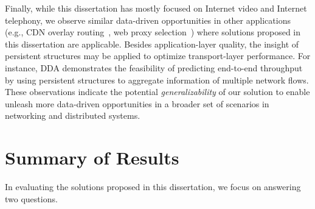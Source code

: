 %
Finally, while this dissertation has mostly focused on 
Internet video and Internet telephony, 
we observe similar data-driven opportunities in other applications
(e.g., CDN overlay routing~\cite{mukerjee2015practical}, 
web proxy selection~\cite{footprint})
where solutions proposed in this dissertation are applicable.
Besides application-layer quality, the insight of persistent structures may be applied 
to optimize transport-layer performance.
For instance, DDA demonstrates the feasibility of predicting end-to-end 
throughput by using persistent structures to aggregate information of multiple network flows.
These observations indicate the potential {\em generalizability} of our solution to enable
unleash more data-driven opportunities in a broader set of scenarios in 
networking and distributed systems.







\section{Summary of Results}
In evaluating the solutions proposed in this dissertation, 
we focus on answering two questions.

